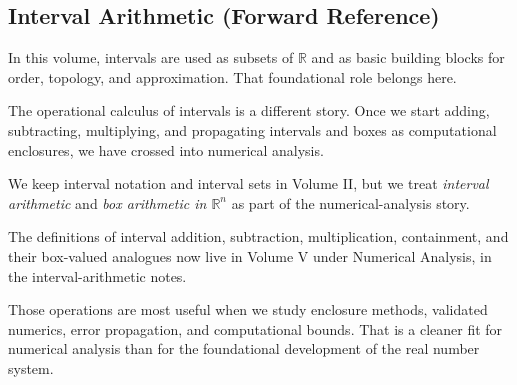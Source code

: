 
\subsection{Interval Arithmetic (Forward Reference)}

\begin{exposition}
In this volume, intervals are used as subsets of $\mathbb{R}$ and as basic
building blocks for order, topology, and approximation. That foundational
role belongs here.
\end{exposition}

\begin{exposition}
The operational calculus of intervals is a different story. Once we start
adding, subtracting, multiplying, and propagating intervals and boxes as
computational enclosures, we have crossed into numerical analysis.
\end{exposition}

\begin{remark*}
We keep interval notation and interval sets in Volume II, but we treat
\emph{interval arithmetic} and \emph{box arithmetic in $\mathbb{R}^n$} as
part of the numerical-analysis story.
\end{remark*}

\begin{remark*}
The definitions of interval addition, subtraction, multiplication,
containment, and their box-valued analogues now live in Volume V under
Numerical Analysis, in the interval-arithmetic notes.
\end{remark*}

\begin{remark*}
Those operations are most useful when we study enclosure methods, validated
numerics, error propagation, and computational bounds. That is a cleaner fit
for numerical analysis than for the foundational development of the real
number system.
\end{remark*}
